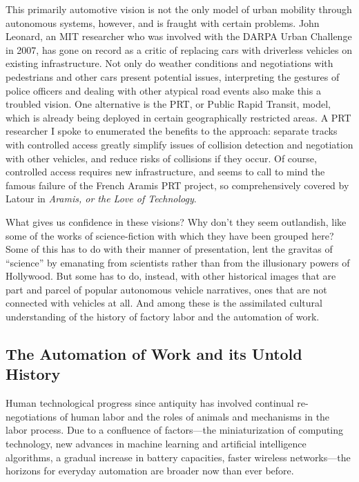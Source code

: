 This primarily automotive vision is not the only model of urban
mobility through autonomous systems, however, and is fraught with
certain problems. John Leonard, an MIT researcher who was involved
with the DARPA Urban Challenge in 2007, has gone on record as a critic
of replacing cars with driverless vehicles on existing infrastructure.
Not only do weather conditions and negotiations with pedestrians and
other cars present potential issues, interpreting the gestures of
police officers and dealing with other atypical road events also make
this a troubled vision. One alternative is the PRT, or Public Rapid
Transit, model, which is already being deployed in certain
geographically restricted areas. A PRT researcher I spoke to
enumerated the benefits to the approach: separate tracks with
controlled access greatly simplify issues of collision detection and
negotiation with other vehicles, and reduce risks of collisions if
they occur. Of course, controlled access requires new infrastructure,
and seems to call to mind the famous failure of the French Aramis PRT
project, so comprehensively covered by Latour in \emph{Aramis, or the
  Love of Technology}. 

What gives us confidence in these visions? Why don't they seem
outlandish, like some of the works of science-fiction with which they have
been grouped here? Some of this has to do with their manner of
presentation, lent the gravitas of ``science'' by emanating from
scientists rather than from the
illusionary powers of Hollywood. But some has to do, instead, with other historical images
that are part and parcel of
popular autonomous vehicle narratives, ones that are not connected
with vehicles at all. And among these is the assimilated cultural
understanding of the history of factory labor and the automation of
work.


\subsection{The Automation of Work and its Untold History}

Human technological progress since antiquity has
involved continual re-negotiations of human labor and the roles of
animals and mechanisms in the labor process. Due to a confluence
of factors---the miniaturization of computing technology, new
advances in machine learning and artificial intelligence algorithms, a
gradual increase in battery capacities, faster wireless networks---the
horizons for everyday automation are broader now than ever before. 

